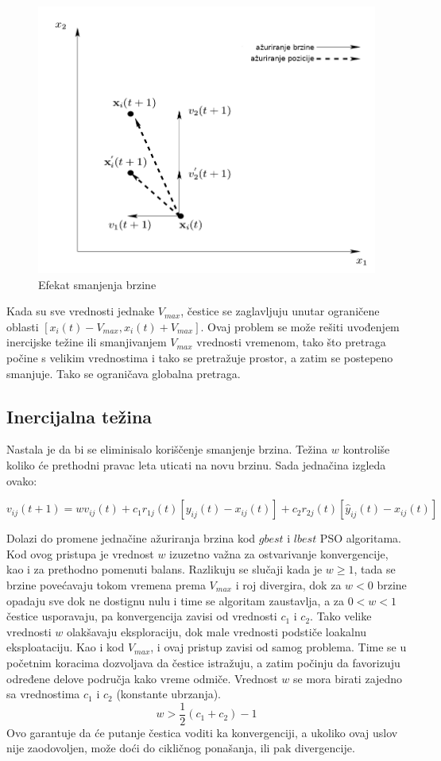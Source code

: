 \documentclass[a4paper]{article}
\begin{document}
\begin{figure}[htp]
    \centering
    \includegraphics[scale=0.25]{slika3_1.png}
    \caption{Efekat smanjenja brzine}
    \label{fig:smanjenje_brzina}
\end{figure}

Kada su sve vrednosti jednake $V_{max}$, čestice se zaglavljuju unutar ograničene oblasti $[x_i(t)-V_{max} , x_i(t) + V_{max} ]$.  Ovaj problem se može rešiti uvođenjem inercijske težine ili smanjivanjem  $V_{max}$ vrednosti vremenom, tako što pretraga počine s velikim vrednostima i tako se pretražuje prostor, a zatim se postepeno smanjuje. Tako se ograničava globalna pretraga.

\subsection{Inercijalna težina}
Nastala je da bi se eliminisalo koriščenje smanjenje brzina. Težina $w$  kontroliše koliko će prethodni pravac leta uticati na novu brzinu. Sada jednačina izgleda ovako:

\[v_{ij}(t+1) = wv_{ij}(t) + c_1r_{1j}(t)[y_{ij}(t) - x_{ij}(t)] + c_2r_{2j}(t)[\hat{y}_{ij}(t) - x_{ij}(t)] \]

Dolazi do promene jednačine ažuriranja brzina kod $gbest$ i $lbest$ PSO algoritama.
Kod ovog pristupa je vrednost $w$ izuzetno važna za ostvarivanje konvergencije, kao i za prethodno pomenuti balans. Razlikuju se slučaji kada je $w \geq 1$, tada se brzine povećavaju tokom vremena prema $V_{max}$ i roj divergira, dok za $w < 0$ brzine opadaju sve dok ne dostignu nulu i time se algoritam zaustavlja, a za $0 < w < 1$ čestice usporavaju, pa konvergencija zavisi od vrednosti $c_1$ i $c_2$. Tako velike vrednosti  $w$ olakšavaju eksploraciju, dok male vrednosti podstiče loakalnu eksploataciju. 
Kao i kod $V_{max}$, i ovaj pristup zavisi od samog problema. Time se u početnim koracima dozvoljava da čestice istražuju, a zatim počinju da favorizuju određene delove područja kako vreme odmiče.
Vrednost $w$ se mora birati zajedno sa vrednostima $c_1$ i $c_2$ (konstante ubrzanja). $$w > \frac{1}{2}(c_1 + c_2) - 1$$ Ovo garantuje da će putanje čestica voditi ka konvergenciji, a ukoliko ovaj uslov nije zaodovoljen, može doći do cikličnog ponašanja, ili pak divergencije.
\end{document}
